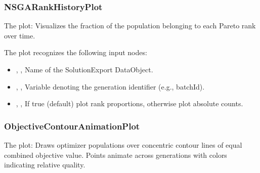 \subsubsection{NSGARankHistoryPlot}
The   plot: Visualizes the fraction of the population belonging to each Pareto rank over time.

The  plot recognizes the following input nodes:
\begin{itemize}
  \item {}, , Name of the SolutionExport DataObject.
  \item {}, , Variable denoting the generation identifier (e.g., batchId).
  \item {}, , If true (default) plot rank proportions, otherwise plot absolute counts.
\end{itemize}

\subsubsection{ObjectiveContourAnimationPlot}
The   plot: Draws optimizer populations over concentric contour lines of equal combined objective value. Points animate across generations with colors indicating relative quality.

